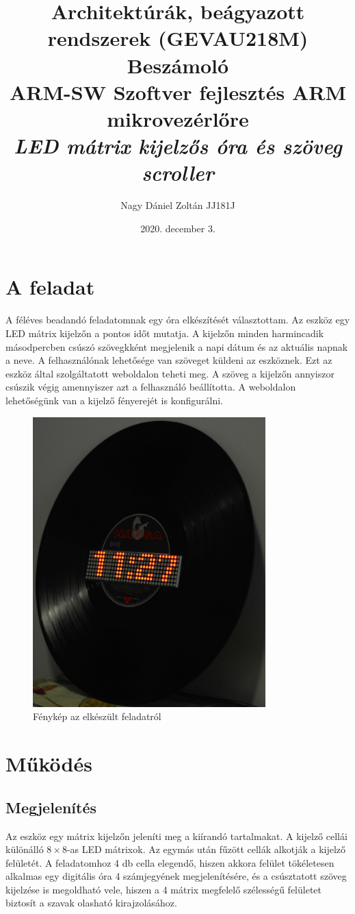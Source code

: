 \documentclass[a4paper, 12pt]{article}
\title{Architektúrák, beágyazott rendszerek (GEVAU218M)\\\LARGE{\textbf{Beszámoló}}\\ \medskip \large{\textbf{ARM-SW} Szoftver fejlesztés ARM mikrovezérlőre} \\ \bigskip \LARGE{\textit{LED mátrix kijelzős óra és szöveg scroller}}}
\date{2020. december 3.}
\author{Nagy Dániel Zoltán JJ181J}
\begin{document}
\maketitle

\section{A feladat}
A féléves beadandó feladatomnak egy óra elkészítését választottam.
Az eszköz egy LED mátrix kijelzőn a pontos időt mutatja. A kijelzőn minden harmincadik másodpercben csúszó szövegkként megjelenik a napi dátum és az aktuális napnak a neve. A felhasználónak lehetősége van szöveget küldeni az eszköznek. Ezt az eszköz által szolgáltatott weboldalon teheti meg. A szöveg a kijelzőn annyiszor csúszik végig amennyiszer azt a felhasználó beállította. A weboldalon lehetőségünk van a kijelző fényerejét is konfigurálni.

\begin{figure}[ht]
	\centering
	\includegraphics[width = 9cm]{images/vinyl_clock.JPG}
	\caption{Fénykép az elkészült feladatról}
	\label{fig:product}
\end{figure}	

\section{Működés}

\subsection{Megjelenítés}
Az eszköz egy mátrix kijelzőn jeleníti meg a kiírandó tartalmakat. A kijelző cellái különálló $8\times 8$-as LED mátrixok. Az egymás után fűzött cellák alkotják a kijelző felületét. A feladatomhoz 4 db cella elegendő, hiszen akkora felület tökéletesen alkalmas egy digitális óra 4 számjegyének megjelenítésére, és a csúsztatott szöveg kijelzése is megoldható vele, hiszen a 4 mátrix megfelelő szélességű felületet biztosít a szavak olasható kirajzolásához.
\end{document}
